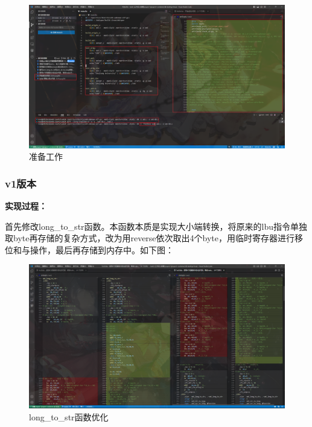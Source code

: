 \documentclass[12pt,hyperref,a4paper,UTF8]{ctexart}
\begin{document}
  \begin{figure}[H]
      \centering
      \includegraphics[width =1.0\textwidth]{figures/fig/image10.png}
      \caption{准备工作}
  \end{figure}

\newpage

\subsubsection{v1版本}
\textbf{实现过程：}

首先修改long\_to\_str函数。本函数本质是实现大小端转换，将原来的lbu指令单独取byte再存储的复杂方式，改为用reverse依次取出4个byte，用临时寄存器进行移位和与操作，最后再存储到内存中。如下图：

  \begin{figure}[H]
      \centering
      \includegraphics[width =1.0\textwidth]{figures/fig/image11.png}
      \caption{long\_to\_str函数优化}
  \end{figure}
\end{document}
